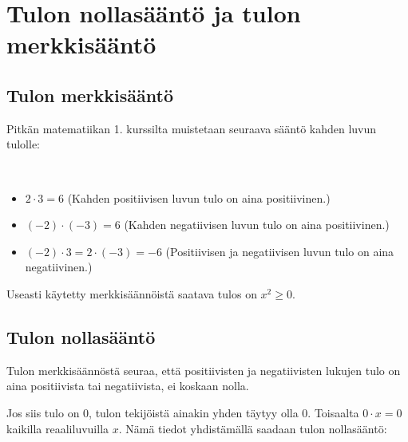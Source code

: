 \chapter{Tulon nollasääntö ja tulon merkkisääntö}

\section{Tulon merkkisääntö}

Pitkän matematiikan 1. kurssilta muistetaan seuraava sääntö kahden luvun tulolle:


\begin{esimerkki}{\ }
\begin{itemize}
  \item $2\cdot 3 = 6$ (Kahden positiivisen luvun tulo on aina positiivinen.)
  \item $(-2)\cdot (-3) = 6$ (Kahden negatiivisen luvun tulo on aina positiivinen.)
  \item $(-2)\cdot 3 = 2\cdot (-3) = -6$ (Positiivisen ja negatiivisen luvun tulo on aina negatiivinen.)
\end{itemize}
\end{esimerkki}

Useasti käytetty merkkisäännöistä saatava tulos on $x^2 \geq 0$.

\section{Tulon nollasääntö}

Tulon merkkisäännöstä seuraa, että positiivisten ja negatiivisten lukujen tulo on aina positiivista tai negatiivista, ei koskaan nolla.

Jos siis tulo on 0, tulon tekijöistä ainakin yhden täytyy olla 0. Toisaalta
$0\cdot x = 0$ kaikilla reaaliluvuilla $x$. 
Nämä tiedot yhdistämällä saadaan tulon nollasääntö:


